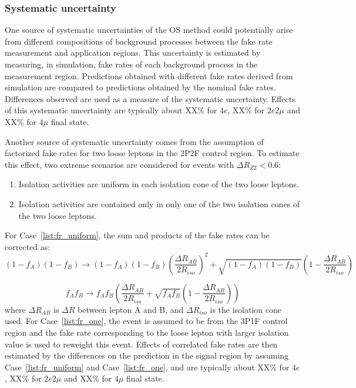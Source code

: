 \subsubsection{Systematic uncertainty}
One source of systematic uncertainties of the OS method could potentially arise from different compositions of 
background processes between the fake rate measurement and application regions. This uncertainty is estimated 
by measuring, in simulation, fake rates of each background process in the measurement region. Predictions 
obtained with different fake rates derived from simulation are compared to predictions obtained by the nominal 
fake rates. Differences observed are used as a measure of the systematic uncertainty. Effects of this systematic 
uncertainty are typically about XX\% for $4e$, XX\% for $2e2\mu$ and XX\% for $4\mu$ final state.

Another source of systematic uncertainty comes from the assumption of factorized fake rates for two loose leptons 
in the 2P2F control region. To estimate this effect, two extreme scenarios are considered for events with 
$\Delta R_{Z2} < 0.6$:
\begin{enumerate}
    \item Isolation activities are uniform in each isolation cone of the two loose leptons. \label{list:fr_uniform} 
    \item Isolation activities are contained only in only one of the two isolation cones of the two loose leptons. \label{list:fr_one} 
\end{enumerate}
For Case~\ref{list:fr_uniform}, the sum and products of the fake rates can be corrected as:
\begin{equation}
\label{eq:syst_corrfr_sum}
\left(1-f_A\right)\left(1-f_B\right) \rightarrow \left(1-f_A\right)\left(1-f_B\right) \left(\frac{\Delta R_{AB}}{2R_{iso}} \right)^2 + \sqrt{\left(1-f_A\right)\left(1-f_B\right)} \left(1-\frac{\Delta R_{AB}}{2R_{iso}} \right)
\end{equation}

\begin{equation}
\label{eq:syst_corrfr_prod}
f_A f_B \rightarrow f_A f_B \left(\frac{\Delta R_{AB}}{2R_{iso}} + \sqrt{f_A f_B} (1-\frac{\Delta R_{AB}}{2R_{iso}}) \right)
\end{equation}
where $\Delta R_{AB}$ is $\Delta R$ between lepton A and B, and $\Delta R_{iso}$ is the isolation cone used.
For Case~\ref{list:fr_one}, the event is assumed to be from the 3P1F control region and the fake rate corresponding to the 
loose lepton with larger isolation value is used to reweight this event. Effects of correlated fake rates are then 
estimated by the differences on the prediction in the signal region by assuming Case~\ref{list:fr_uniform} and 
Case~\ref{list:fr_one}, and are typically about XX\% for $4e$, XX\% for $2e2\mu$ and XX\% for $4\mu$ final state.
